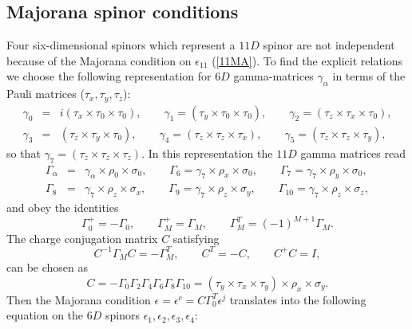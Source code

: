 \documentclass[a4paper,12pt]{article}
\begin{document}
\begin{appendix}
\section{Majorana spinor conditions}
Four six-dimensional spinors which represent a $11D$ spinor are
not independent because of the Majorana condition on
$\epsilon_{11}$ (\ref{11MA}). To find the explicit relations we
choose the following representation for $6D$ gamma-matrices
$\gamma_\alpha$ in terms of the Pauli matrices ($\tau_x, \tau_y,
\tau_z$):
\begin{eqnarray}
\gamma_0 &=& i(\tau_x \times \tau_0 \times \tau_0), \qquad
\gamma_1 = (\tau_y \times \tau_0 \times \tau_0), \qquad \gamma_2
= (\tau_z \times \tau_x \times \tau_0), \nonumber\\
\gamma_3 &=& (\tau_z \times \tau_y \times \tau_0), \qquad
\gamma_4 = (\tau_z \times \tau_z \times \tau_x), \qquad \gamma_5
= (\tau_z \times \tau_z \times \tau_y),
\end{eqnarray}
so that $\gamma_7=(\tau_z \times \tau_z \times \tau_z)$. In this
representation the $11D$ gamma matrices read
\begin{eqnarray}
\Gamma_\alpha &=& \gamma_\alpha \times \rho_0 \times \sigma_0,
\qquad \Gamma_6 = \gamma_7 \times \rho_x \times \sigma_0, \qquad
\Gamma_7 = \gamma_7 \times \rho_y \times \sigma_0, \nonumber\\
\Gamma_8 &=& \gamma_7 \times \rho_z \times \sigma_x, \qquad
\Gamma_9 = \gamma_7 \times \rho_z \times \sigma_y, \qquad
\Gamma_{10} = \gamma_7 \times \rho_z \times \sigma_z,
\end{eqnarray}
and obey the identities
\begin{equation}
\Gamma_0^+ = -\Gamma_0, \qquad \Gamma_M^+ = \Gamma_M, \qquad
\Gamma_M^T = (-1)^{M+1} \Gamma_M.
\end{equation}
The charge conjugation matrix $C$ satisfying
\begin{equation}
C^{-1} \Gamma_M C = -\Gamma_M^T, \qquad C^T = -C, \qquad C^+ C=I,
\end{equation}
can be chosen as
\begin{equation}
C = -\Gamma_0 \Gamma_2 \Gamma_4 \Gamma_6 \Gamma_8 \Gamma_{10} =
(\tau_y \times \tau_x \times \tau_y) \times \rho_x \times
\sigma_y.
\end{equation}
Then the Majorana condition $\epsilon=\epsilon^c=C\Gamma_0^T
\epsilon^j$ translates into the following equation on the $6D$
spinors $\epsilon_1, \epsilon_2, \epsilon_3, \epsilon_4$:
\begin{equation}

\end{equation}
\end{appendix}
\end{document}
